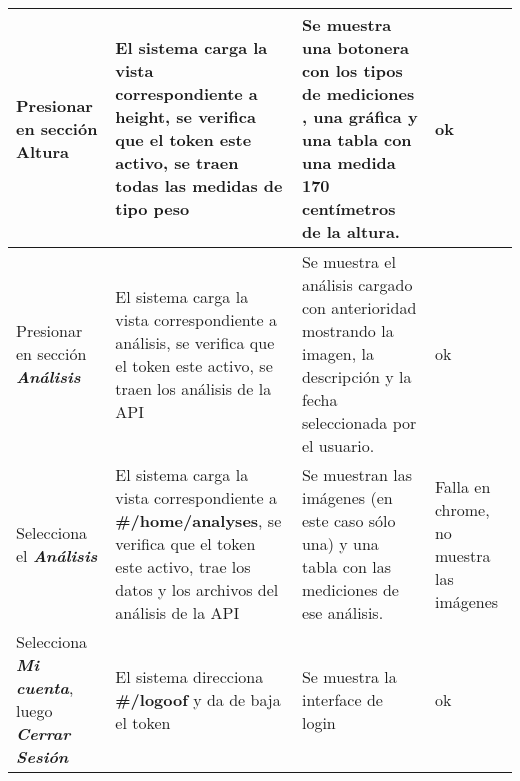 {\begin{longtable}{|p{4cm}|p{4cm}|p{4cm}|p{3cm}|}
  						
  						
  						
  						Presionar en sección \textbf{Altura }
  						& El sistema carga la vista correspondiente a height, se verifica que el token este activo, se traen todas las medidas de tipo peso
  						& Se muestra una botonera con los tipos de mediciones , una gráfica y una tabla con una medida \textbf{170 centímetros} de la altura.
  						& ok
  						\\ \hline
  						
  						
  						
  						
  						
  						Presionar en sección \textit{\textbf{Análisis }} 
  						& El sistema carga la vista correspondiente a análisis, se verifica que el token este activo, se traen los análisis de la API
  						& Se muestra el análisis cargado con anterioridad mostrando la imagen, la descripción y la fecha seleccionada por el usuario.
  						& ok
  						\\ \hline
  						
  						
  						
  						
  						
  						
  						Selecciona el \textit{\textbf{Análisis}}
  						& El sistema carga la vista correspondiente a \textbf{ \#/home/analyses}, se verifica que el token este activo, trae los datos y los archivos del análisis de la API
  						& Se muestran las imágenes (en este caso sólo una) y una tabla con las mediciones de ese análisis.
  						& Falla en chrome, no muestra las imágenes
  						\\ \hline
  						
  						
  						
  						
  						Selecciona \textit{\textbf{Mi cuenta}}, luego \textit{\textbf{Cerrar Sesión}}
  						& El sistema direcciona \textbf{\#/logoof } y da de baja el token
  						& Se muestra la interface de login
  						& ok
  						\\ \hline
  						
  						
  					\end{longtable}
  					
  				}
  					
 
